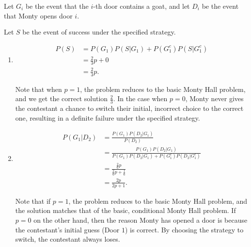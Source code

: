 Let $G_{i}$ be the event that the $i$-th door contains a goat, and let
$D_{i}$ be the event that Monty opens door $i$.

Let $S$ be the event of success under the specified strategy.

\begin{enumerate}[label=(\alph*)]
\item
\begin{align*}
P(S) &= P(G_{1})P(S|G_{1}) + P(G_{1}^{c})P(S|G_{1}^{c}) \\
&= \frac{2}{3}p + 0 \\
&= \frac{2}{3}p.
\end{align*}

Note that when $p=1$, the problem reduces to the basic Monty Hall problem,
and we get the correct solution $\frac{2}{3}$. In the case when $p=0$, Monty
never gives the contestant a chance to switch their initial, incorrect choice to
the correct one, resulting in a definite failure under the specified strategy.

\item
\begin{align*}
P(G_{1}|D_{2}) &= \frac{P(G_{1})P(D_{2}|G_{1})}{P(D_{2})} \\
&= \frac{P(G_{1})P(D_{2}|G_{1})}{P(G_{1})P(D_{2}|G_{1}) + P(G_{1}^{c})P(D_{2}|G_
{1}^{c})} \\
&= \frac{\frac{2}{6}p}{\frac{2}{6}p + \frac{1}{6}} \\
&= \frac{2p}{2p+1}.
\end{align*}

Note that if $p=1$, the problem reduces to the basic Monty Hall problem,
and the solution matches that of the basic, conditional Monty Hall problem.
If $p=0$ on the other hand, then the reason Monty has opened a door is
because the contestant's initial guess (Door $1$) is correct. By choosing the
strategy to switch, the contestant always loses. 
\end{enumerate}


